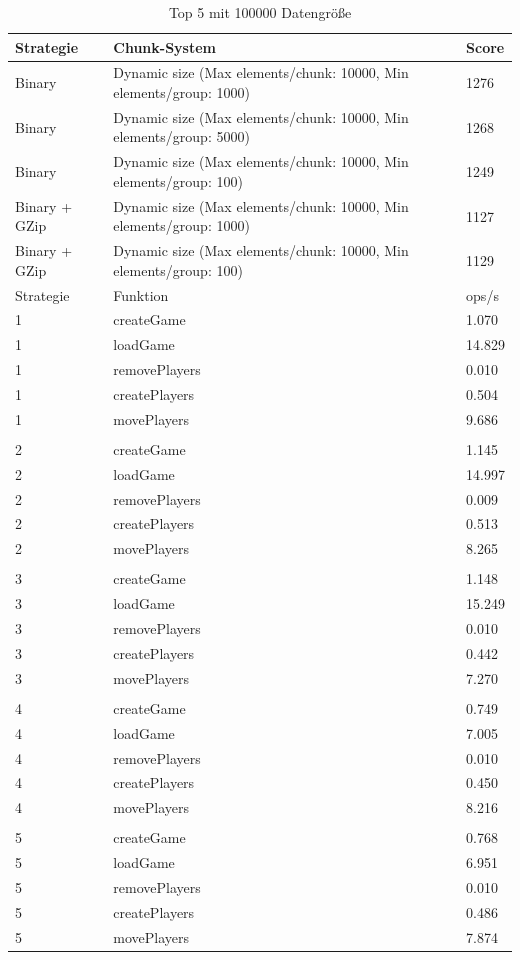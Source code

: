 \begin{table}[htp]
    \centering
    \caption{Top 5 mit 100000 Datengröße}
    \begin{tabular}{|l|l|l|}
    \hline
        Strategie & Chunk-System & Score \\
        \hline
        Binary & Dynamic size (Max elements/chunk: 10000, Min elements/group: 1000) & 1276\\
        Binary & Dynamic size (Max elements/chunk: 10000, Min elements/group: 5000) & 1268\\
        Binary & Dynamic size (Max elements/chunk: 10000, Min elements/group: 100) & 1249\\
        Binary + GZip & Dynamic size (Max elements/chunk: 10000, Min elements/group: 1000) & 1127\\
        Binary + GZip & Dynamic size (Max elements/chunk: 10000, Min elements/group: 100) & 1129\\
        \hline
        Strategie & Funktion & ops/s \\
        \hline
        1 & createGame & 1.070\\
        1 & loadGame & 14.829\\
        1 & removePlayers & 0.010\\
        1 & createPlayers & 0.504\\
        1 & movePlayers & 9.686\\
        & & \\
        2 & createGame & 1.145\\
        2 & loadGame & 14.997\\
        2 & removePlayers & 0.009\\
        2 & createPlayers & 0.513\\
        2 & movePlayers & 8.265\\
        & & \\
        3 & createGame & 1.148\\
        3 & loadGame & 15.249\\
        3 & removePlayers & 0.010\\
        3 & createPlayers & 0.442\\
        3 & movePlayers & 7.270\\
        & & \\
        4 & createGame & 0.749\\
        4 & loadGame & 7.005\\
        4 & removePlayers & 0.010\\
        4 & createPlayers & 0.450\\
        4 & movePlayers & 8.216\\
        & & \\
        5 & createGame & 0.768\\
        5 & loadGame & 6.951\\
        5 & removePlayers & 0.010\\
        5 & createPlayers & 0.486\\
        5 & movePlayers & 7.874\\
        \hline
    \end{tabular}
    \label{tbl:bigDataCount}
\end{table}

